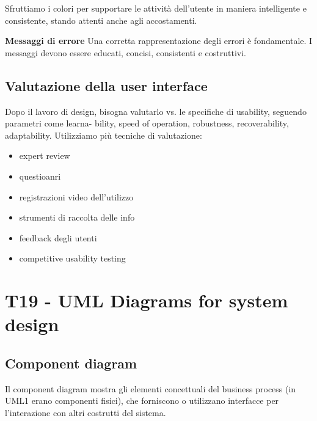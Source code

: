 \documentclass{article}
\begin{document}
Sfruttiamo i colori per supportare le
attività dell'utente in maniera intelligente e consistente, stando attenti anche agli accostamenti.




\textbf{Messaggi di errore} Una corretta rappresentazione degli errori è fondamentale. I messaggi devono essere
educati, concisi, consistenti e costruttivi.


\subsection{Valutazione della user interface}
Dopo il lavoro di design, bisogna valutarlo vs. le specifiche di usability, seguendo parametri come learna-
bility, speed of operation, robustness, recoverability, adaptability. Utilizziamo più tecniche di valutazione:
\begin{itemize}
    \item expert review
    \item questioanri
    \item registrazioni video dell'utilizzo
    \item strumenti di raccolta delle info
    \item feedback degli utenti
    \item competitive usability testing
\end{itemize}

\section{T19 - UML Diagrams for system design}

\subsection{Component diagram}
Il component diagram mostra gli elementi concettuali del business process (in UML1 erano componenti
fisici), che forniscono o utilizzano interfacce per l'interazione con altri costrutti del sistema.
\end{document}
